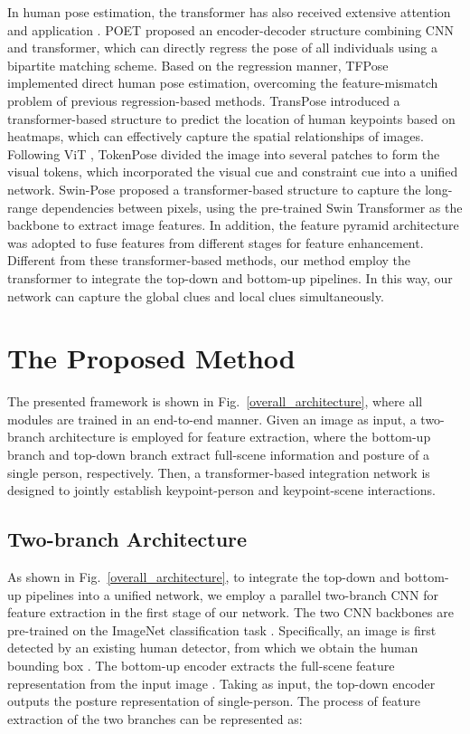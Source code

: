 \documentclass[runningheads]{llncs}
\begin{document}
In human pose estimation, the transformer has also received extensive attention and application \cite{POET2021,Tfpose2021,Transpose2021,Tokenpose2021,Swinpose2022}. POET \cite{POET2021} proposed an encoder-decoder structure combining CNN and transformer, which can directly regress the pose of all individuals using a bipartite matching scheme. Based on the regression manner, TFPose \cite{Tfpose2021} implemented direct human pose estimation, overcoming the feature-mismatch problem of previous regression-based methods. TransPose \cite{Transpose2021} introduced a transformer-based structure to predict the location of human keypoints based on heatmaps, which can effectively capture the spatial relationships of images. Following ViT \cite{VIT2020}, TokenPose \cite{Tokenpose2021} divided the image into several patches to form the visual tokens, which incorporated the visual cue and constraint cue into a unified network.
Swin-Pose \cite{Swinpose2022} proposed a transformer-based structure to capture the long-range dependencies between pixels, using the pre-trained Swin Transformer \cite{swin-transformer2021} as the backbone to extract image features. In addition, the feature pyramid architecture was adopted to fuse features from different stages for feature enhancement. Different from these transformer-based methods, our method employ the transformer to integrate the top-down and bottom-up pipelines. In this way, our network can capture the global clues and local clues simultaneously. 
\section{The Proposed Method} \label{sec:Method}
The presented framework is shown in Fig.~\ref{overall_architecture}, where all modules are trained in an end-to-end manner. Given an image as input, a two-branch architecture is employed for feature extraction, where the bottom-up branch and top-down branch extract full-scene information and posture of a single person, respectively. Then, a transformer-based integration network is designed to jointly establish keypoint-person and keypoint-scene interactions.

\subsection{Two-branch Architecture}
As shown in Fig.~\ref{overall_architecture}, to integrate the top-down and bottom-up pipelines into a unified network, we employ a parallel two-branch CNN for feature extraction in the first stage of our network. The two CNN backbones are pre-trained on the ImageNet classification task \cite{ImageNet2015}. Specifically, an image  is first detected by an existing human detector, from which we obtain the human bounding box . 
The bottom-up encoder  extracts the full-scene feature representation  from the input image . Taking  as input, the top-down encoder  outputs the posture representation  of single-person. The process of feature extraction of the two branches can be represented as:
\end{document}
